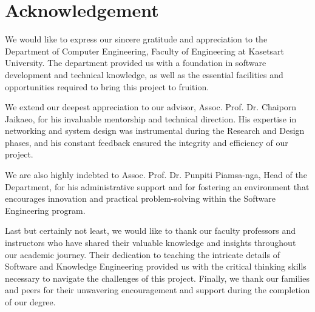 \chapter*{Acknowledgement}
\label{chap:acknowledgement}

We would like to express our sincere gratitude and appreciation to the Department of Computer Engineering, Faculty of Engineering at Kasetsart University. The department provided us with a foundation in software development and technical knowledge, as well as the essential facilities and opportunities required to bring this project to fruition.

We extend our deepest appreciation to our advisor, Assoc. Prof. Dr. Chaiporn Jaikaeo, for his invaluable mentorship and technical direction. His expertise in networking and system design was instrumental during the Research and Design phases, and his constant feedback ensured the integrity and efficiency of our project.

We are also highly indebted to Assoc. Prof. Dr. Punpiti Piamsa-nga, Head of the Department, for his administrative support and for fostering an environment that encourages innovation and practical problem-solving within the Software Engineering program.

Last but certainly not least, we would like to thank our faculty professors and instructors who have shared their valuable knowledge and insights throughout our academic journey. Their dedication to teaching the intricate details of Software and Knowledge Engineering provided us with the critical thinking skills necessary to navigate the challenges of this project. Finally, we thank our families and peers for their unwavering encouragement and support during the completion of our degree.


\vspace{.2in}
\begin{flushright}
    \usevar{\srsAuthorOne} \\
    \usevar{\srsAuthorTwo} \\
    \usevar{\srsAuthorThree}
\end{flushright}